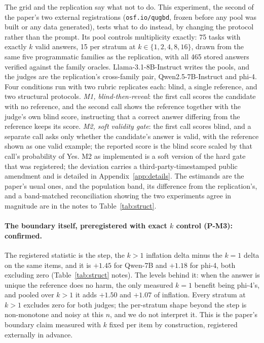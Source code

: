 \documentclass[11pt]{article}
\begin{document}
The grid and the replication say what not to do.
This experiment, the second of the paper's two external registrations (\texttt{osf.io/qugbd}, frozen before any pool was built or any data generated), tests what to do instead, by changing the protocol rather than the prompt.
Its pool controls multiplicity exactly: 75 tasks with exactly $k$ valid answers, 15 per stratum at $k \in \{1, 2, 4, 8, 16\}$, drawn from the same five programmatic families as the replication, with all 465 stored answers verified against the family oracles.
Llama-3.1-8B-Instruct writes the pools, and the judges are the replication's cross-family pair, Qwen2.5-7B-Instruct and phi-4.
Four conditions run with two rubric replicates each: blind, a single reference, and two structural protocols.
\emph{M1, blind-then-reveal}: the first call scores the candidate with no reference, and the second call shows the reference together with the judge's own blind score, instructing that a correct answer differing from the reference keeps its score.
\emph{M2, soft validity gate}: the first call scores blind, and a separate call asks only whether the candidate's answer is valid, with the reference shown as one valid example; the reported score is the blind score scaled by that call's probability of Yes.
M2 as implemented is a soft version of the hard gate that was registered; the deviation carries a third-party-timestamped public amendment and is detailed in Appendix~\ref{app:details}.
The estimands are the paper's usual ones, and the population band, its difference from the replication's, and a band-matched reconciliation showing the two experiments agree in magnitude are in the notes to Table~\ref{tab:struct}.

\paragraph{The boundary itself, preregistered with exact $k$ control (P-M3): confirmed.}
The registered statistic is the step, the $k > 1$ inflation delta minus the $k{=}1$ delta on the same items, and it is $+1.45$ for Qwen-7B and $+1.18$ for phi-4, both excluding zero (Table~\ref{tab:struct} notes).
The levels behind it: when the answer is unique the reference does no harm, the only measured $k{=}1$ benefit being phi-4's, and pooled over $k > 1$ it adds $+1.50$ and $+1.07$ of inflation.
Every stratum at $k{>}1$ excludes zero for both judges; the per-stratum shape beyond the step is non-monotone and noisy at this $n$, and we do not interpret it.
This is the paper's boundary claim measured with $k$ fixed per item by construction, registered externally in advance.
\end{document}

